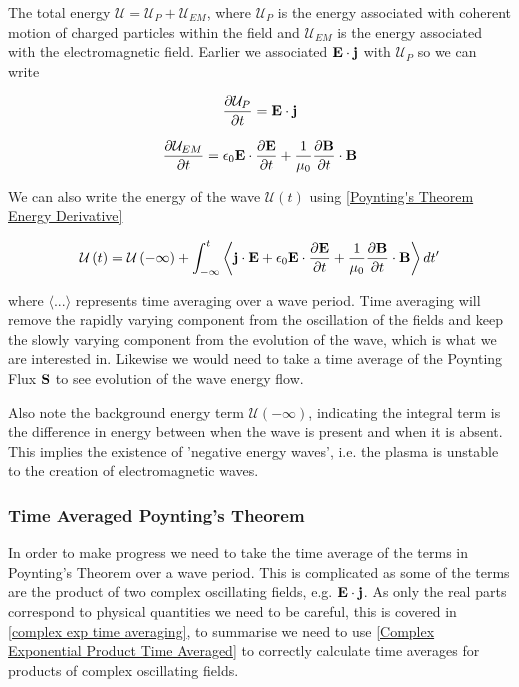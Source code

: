 The total energy $\mathcal{U} = \mathcal{U}_{P} + \mathcal{U}_{EM} $, where $\mathcal{U}_{P}$ is the energy associated with coherent motion of charged particles within the field and $\mathcal{U}_{EM}$ is the energy associated with the electromagnetic field. Earlier we associated $\E \cdot \j$ with $\mathcal{U}_{P}$ so we can write

\begin{equation}
	\frac{\partial \mathcal{U}_{P}}{\partial t} = \E \cdot \j
\end{equation}

\begin{equation}
	\frac{\partial \mathcal{U}_{EM}}{\partial t} = \epsilon_0 \E \cdot \frac{\partial \E}{\partial t} + \frac{1}{\mu_0} \frac{\partial \B}{\partial t} \cdot \B
\end{equation}

We can also write the energy of the wave $\mathcal{U} \left( t \right)$ using \eqref{Poynting's Theorem Energy Derivative}

\begin{equation} \label{Poynting's Theorem Wave Energy}
	\mathcal{U} \left( t \right) = \mathcal{U} \left( - \infty \right) + \int_{-\infty}^{t} \left\langle  \j \cdot \E + \epsilon_0 \E \cdot \frac{\partial \E}{\partial t} + \frac{1}{\mu_0} \frac{\partial \B}{\partial t} \cdot \B \right\rangle dt'
\end{equation}

where $\langle ... \rangle$ represents time averaging over a wave period. Time averaging will remove the rapidly varying component from the oscillation of the fields and keep the slowly varying component from the evolution of the wave, which is what we are interested in. Likewise we would need to take a time average of the Poynting Flux $\S$ to see evolution of the wave energy flow.

Also note the background energy term $\mathcal{U} \left( -\infty \right)$, indicating the integral term is the difference in energy between when the wave is present and when it is absent. This implies the existence of 'negative energy waves', i.e. the plasma is unstable to the creation of electromagnetic waves.

\subsubsection{Time Averaged Poynting's Theorem}
In order to make progress we need to take the time average of the terms in Poynting's Theorem over a wave period. This is complicated as some of the terms are the product of two complex oscillating fields, e.g. $\E \cdot \j$. As only the real parts correspond to physical quantities we need to be careful, this is covered in \ref{complex exp time averaging}, to summarise we need to use \eqref{Complex Exponential Product Time Averaged} to correctly calculate time averages for products of complex oscillating fields.


